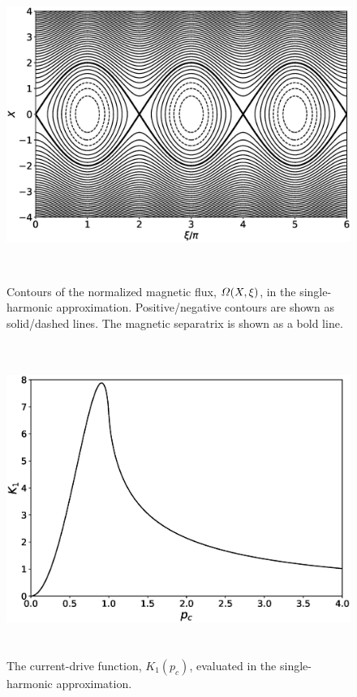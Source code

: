 \documentclass[12pt,prb,aps]{revtex4-1}
\begin{document}
\begin{figure}
\centerline{\includegraphics[height=4in]{Figure1.eps}}
\caption{Contours of the normalized magnetic flux, ${\mit\Omega}(X,\xi)$, in the single-harmonic approximation. Positive/negative contours are shown as solid/dashed lines. The magnetic separatrix is shown
as a  bold line.}\label{fig1}
\end{figure}

\begin{figure}
\centerline{\includegraphics[height=4in]{Figure2.eps}}
\caption{The current-drive function, $K_1(p_c)$, evaluated in the single-harmonic approximation.}\label{fig2}
\end{figure}
\end{document}
